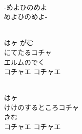 \documentclass[10pt,b5j]{tarticle} %
\begin{document}
\vspace{1.5em} %
\newcommand{\linespace}{0.5em} %
\newcommand{\blocksize}{0.5\hsize} %
\newcommand{\itemmargin}{3em} %
\begin{enumerate} %
    \setlength{\itemindent}{\itemmargin} %
    \begin{minipage}[c]{\blocksize}
    
        \vspace{\linespace}
        \item~\\
        -めよひのめよ\\
        めよひのめよ-
        
    \end{minipage}
    \begin{minipage}[c]{\blocksize}
        
        \vspace{\linespace}
        \item~\\
        はヶ がむ\\
        にてたるコチャ\\
        エルムのでく\\
        コチャエ コチャエ
        
    \end{minipage}
    \begin{minipage}[c]{\blocksize}
        
        \vspace{\linespace}
        \item~\\
        はヶ　\\
        けけのするところコチャ\\
        きむ\\
        コチャエ コチャエ
        
    \end{minipage}
    \begin{minipage}[c]{\blocksize}
        

\end{minipage}
\end{enumerate}
\end{document}
